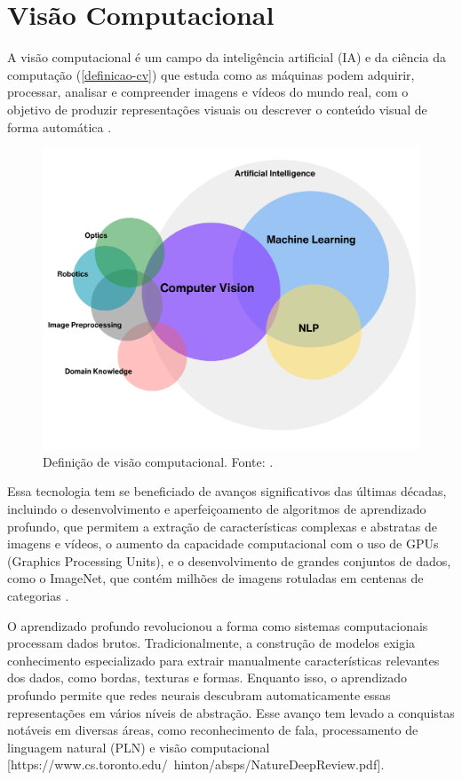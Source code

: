 \section{Visão Computacional}\label{sec:visao-computacional}

A visão computacional é um campo da inteligência artificial (IA) e da ciência da computação (\autoref{definicao-cv}) que estuda como as máquinas podem adquirir, processar, analisar e compreender imagens e vídeos do mundo real, com o objetivo de produzir representações visuais ou descrever o conteúdo visual de forma automática \cite{huggingface2024}.

\begin{figure}[h]
    \centering
    \includegraphics[width=\linewidth]{figs/CV_in_defintiion.png}
    \caption{Definição de visão computacional. Fonte: \cite{huggingface2024}.}
    \label{definicao-cv}
\end{figure}

Essa tecnologia tem se beneficiado de avanços significativos das últimas décadas, incluindo o desenvolvimento e aperfeiçoamento de algoritmos de aprendizado profundo, que permitem a extração de características complexas e abstratas de imagens e vídeos, o aumento da capacidade computacional com o uso de GPUs (Graphics Processing Units), e o desenvolvimento de grandes conjuntos de dados, como o ImageNet, que contém milhões de imagens rotuladas em centenas de categorias \cite{Esteva2021}.

O aprendizado profundo revolucionou a forma como sistemas computacionais processam dados brutos. Tradicionalmente, a construção de modelos exigia conhecimento especializado para extrair manualmente características relevantes dos dados, como bordas, texturas e formas. Enquanto isso, o aprendizado profundo permite que redes neurais descubram automaticamente essas representações em vários níveis de abstração. Esse avanço tem levado a conquistas notáveis em diversas áreas, como reconhecimento de fala, processamento de linguagem natural (PLN) e visão computacional [https://www.cs.toronto.edu/~hinton/absps/NatureDeepReview.pdf].

